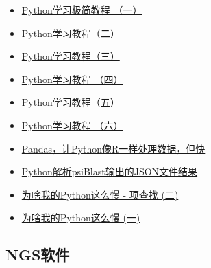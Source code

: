 \documentclass[]{article}
\providecommand{\tightlist}{%
  \setlength{\itemsep}{0pt}\setlength{\parskip}{0pt}}
\numberwithin{figure}{section}
\numberwithin{table}{section}
\theoremstyle{definition}
\theoremstyle{definition}
\theoremstyle{definition}
\theoremstyle{remark}
\begin{document}
\begin{itemize}
\tightlist
\item
  \href{http://mp.weixin.qq.com/s?__biz=MzI5MTcwNjA4NQ==\&mid=2247483866\&idx=1\&sn=310341a1c8d348958c304df03dfd06a0\&chksm=ec0dc450db7a4d46e369637cd2867b0e56389bf4f2e1d0dce409bba38882e61e5063308a13af\#rd}{Python学习极简教程
  （一）}
\item
  \href{http://mp.weixin.qq.com/s?__biz=MzI5MTcwNjA4NQ==\&mid=2247483866\&idx=2\&sn=bf3c07ee1b2936c7ea06b5d4ca820545\&chksm=ec0dc450db7a4d469f4f625babfb595b068137ea2b25a7682f9fb58ff771db6543f43def7950\#rd}{Python学习教程（二）}
\item
  \href{http://mp.weixin.qq.com/s?__biz=MzI5MTcwNjA4NQ==\&mid=2247483866\&idx=3\&sn=dec66c5f3f12919ce1b0bfbb545e3935\&chksm=ec0dc450db7a4d46e91b65446d6a192056ab6ff27c019fe3770cc32816b0ae3f16659ebba0a5\#rd}{Python学习教程（三）}
\item
  \href{http://mp.weixin.qq.com/s?__biz=MzI5MTcwNjA4NQ==\&mid=2247483866\&idx=4\&sn=3a0b0c5c0f736ddeadc4524bae8b2a91\&chksm=ec0dc450db7a4d465602b74e0fa968519a3a085a1901b5cca97ff886163422a24089378ff8f0\#rd}{Python学习教程
  （四）}
\item
  \href{http://mp.weixin.qq.com/s?__biz=MzI5MTcwNjA4NQ==\&mid=2247483866\&idx=5\&sn=fd3526e11c4adf8194e1f92cd6d1749c\&chksm=ec0dc450db7a4d468c7d114352153eecbaedd7d37065f681caa28b74258a92038d1d2030056b\#rd}{Python学习教程（五）}
\item
  \href{http://mp.weixin.qq.com/s?__biz=MzI5MTcwNjA4NQ==\&mid=2247483866\&idx=6\&sn=ef7a0972abc002cfeba27815020e83aa\&chksm=ec0dc450db7a4d46f61328946fe257a1516785fb9a1f7c1663e86e4255ae6b616e3c07ac1cb0\#rd}{Python学习教程
  （六）}
\item
  \href{http://mp.weixin.qq.com/s?__biz=MzI5MTcwNjA4NQ==\&mid=2247483865\&idx=1\&sn=a2e1474bbebce343ff4262e38653f4c4\&chksm=ec0dc453db7a4d45349076b1627eff5e292abceada59e832a46553f4ca614d62df96e097f871\#rd}{Pandas，让Python像R一样处理数据，但快}
\item
  \href{http://mp.weixin.qq.com/s/BN6u2aJkoMzffPv7rvbm8g}{Python解析psiBlast输出的JSON文件结果}
\item
  \href{http://mp.weixin.qq.com/s/-0UTgmdRQbF7I4fib62ooA}{为啥我的Python这么慢
  - 项查找 (二)}
\item
  \href{https://mp.weixin.qq.com/s/n5kkZfC8FGlzeBODarLHcw}{为啥我的Python这么慢
  (一)}
\end{itemize}

\subsection{NGS软件}\label{ngs}
\end{document}
